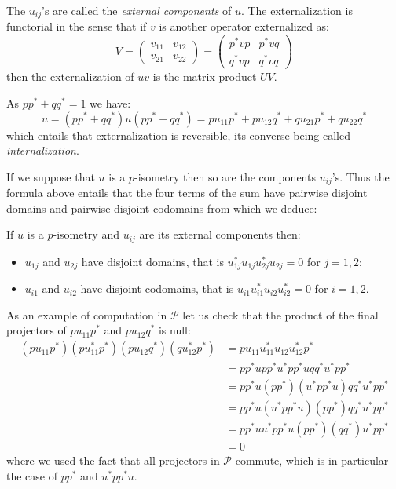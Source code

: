 The \(u_{ij}\)'s are called the \emph{external components} of \(u\). The
externalization is functorial in the sense that if \(v\) is another
operator externalized as:
\begin{equation*}
V = \begin{pmatrix}
  v_{11} & v_{12}\\
  v_{21} & v_{22}
  \end{pmatrix} 
= \begin{pmatrix}
  p^*vp & p^*vq\\
  q^*vp & q^*vq
  \end{pmatrix}
\end{equation*}
then the externalization of \(uv\) is the matrix product \(UV\).

As \(pp^* + qq^* = 1\) we have:
\begin{equation*}
u = (pp^*+qq^*)u(pp^*+qq^*) = pu_{11}p^* + pu_{12}q^* + qu_{21}p^* + qu_{22}q^*
\end{equation*}
which entails that externalization is reversible, its converse being
called \emph{internalization}.

If we suppose that \(u\) is a \(p\)-isometry then so are the components
\(u_{ij}\)'s. Thus the formula above entails that the four terms of the
sum have pairwise disjoint domains and pairwise disjoint codomains from
which we deduce:

\begin{proposition}
If $u$ is a $p$-isometry and $u_{ij}$ are its external components then:
\begin{itemize}
\item $u_{1j}$ and $u_{2j}$ have disjoint domains, that is $u_{1j}^*u_{1j}u_{2j}^*u_{2j} = 0$ for $j=1,2$;
\item $u_{i1}$ and $u_{i2}$ have disjoint codomains, that is $u_{i1}u_{i1}^*u_{i2}u_{i2}^* = 0$ for $i=1,2$.
\end{itemize}
\end{proposition}

As an example of computation in \(\mathcal{P}\) let us check that the
product of the final projectors of \(pu_{11}p^*\) and \(pu_{12}q^*\) is
null:
\begin{align*}
    (pu_{11}p^*)(pu^*_{11}p^*)(pu_{12}q^*)(qu_{12}^*p^*)
    &= pu_{11}u_{11}^*u_{12}u_{12}^*p^*\\
    &= pp^*upp^*u^*pp^*uqq^*u^*pp^*\\
    &= pp^*u(pp^*)(u^*pp^*u)qq^*u^*pp^*\\
    &= pp^*u(u^*pp^*u)(pp^*)qq^*u^*pp^*\\
    &= pp^*uu^*pp^*u(pp^*)(qq^*)u^*pp^*\\
    &= 0
\end{align*}
where we used the fact that all projectors in \(\mathcal{P}\) commute,
which is in particular the case of \(pp^*\) and \(u^*pp^*u\).


